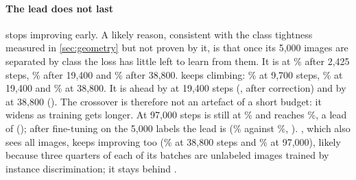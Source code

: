 \paragraph{The lead does not last}
\supcon stops improving early. A likely reason, consistent with the class tightness measured in
\cref{sec:geometry} but not proven by it, is that once its 5,000 images are separated by class the loss has
little left to learn from them. It is at \% after 2,425 steps, \% after 19,400 and
\% after 38,800. \simclr keeps climbing: \% at 9,700 steps,
\% at 19,400 and \% at 38,800. It is ahead by
\pt at 19,400 steps (,
 after correction) and by \pt at
38,800 (). The crossover is therefore not an artefact of a short budget: it
widens as training gets longer. At 97,000 steps \supcon is still at \% and
\simclr reaches \%, a lead of \pt
(); after fine-tuning on the 5,000 labels the lead is
\pt (\% against \%,
). \union, which also sees all images, keeps improving too (\% at 38,800
steps and \% at 97,000), likely because three quarters of each of its batches are unlabeled
images trained by instance discrimination; it stays \pt behind \simclr.


